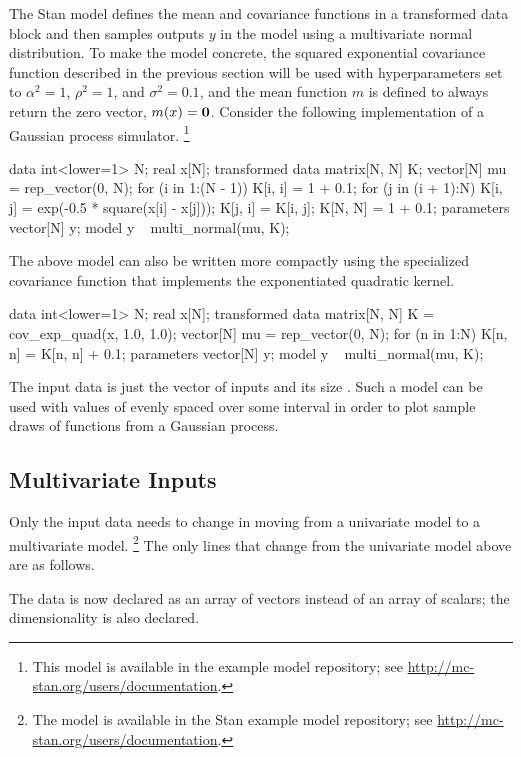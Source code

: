 The Stan model defines the mean and covariance functions in a
transformed data block and then samples outputs $y$ in the model using
a multivariate normal distribution.  To make the model concrete, the
squared exponential covariance function described in the previous section
will be used with hyperparameters set to $\alpha^2 = 1$, $\rho^2 = 1$,
and $\sigma^2 = 0.1$, and the mean function $m$ is defined to always
return the zero vector, $m(x) = {\bf 0}$.  Consider the following
implementation of a Gaussian process simulator.%
%
\footnote{This model is available in the example model repository;
  see \url{http://mc-stan.org/users/documentation}.}
%
\begin{stancode}
data {
  int<lower=1> N;
  real x[N];
}
transformed data {
  matrix[N, N] K;
  vector[N] mu = rep_vector(0, N);
  for (i in 1:(N - 1)) {
    K[i, i] = 1 + 0.1;
    for (j in (i + 1):N) {
      K[i, j] = exp(-0.5 * square(x[i] - x[j]));
      K[j, i] = K[i, j];
    }
  }
  K[N, N] = 1 + 0.1;
}
parameters {
  vector[N] y;
}
model {
  y ~ multi_normal(mu, K);
}
\end{stancode}
%
The above model can also be written more compactly using the specialized
covariance function that implements the exponentiated quadratic kernel.
%
\begin{stancode}
data {
  int<lower=1> N;
  real x[N];
}
transformed data {
  matrix[N, N] K = cov_exp_quad(x, 1.0, 1.0);
  vector[N] mu = rep_vector(0, N);
  for (n in 1:N)
    K[n, n] = K[n, n] + 0.1;
}
parameters {
  vector[N] y;
}
model {
  y ~ multi_normal(mu, K);
}
\end{stancode}
%
The input data is just the vector of inputs  and its size
.  Such a model can be used with values of  evenly
spaced over some interval in order to plot sample draws of functions
from a Gaussian process.

\subsection{Multivariate Inputs}

Only the input data needs to change in moving from a univariate model to a
multivariate model.%
%
\footnote{The model is available in the Stan example model repository;
see \url{http://mc-stan.org/users/documentation}.}
%
The only lines that change from the univariate model above are as follows.
%
\begin{stancode}
data {
  int<lower=1> N;
  int<lower=1> D;
  vector[D] x[N];
}
transformed data {
...
...
\end{stancode}
%
The data is now declared as an array of vectors instead of an array of
scalars; the dimensionality  is also declared.

